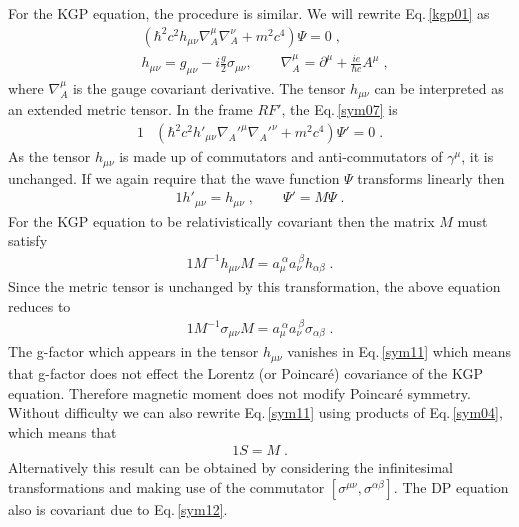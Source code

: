 \documentclass[epj]{svjour}
\begin{document}
For the KGP equation, the procedure is similar. We will rewrite Eq.\,\eqref{kgp01} as
\begin{subequations}
\begin{alignat}{1}
\label{sym07} &\left(\hbar^{2}c^{2}h_{\mu\nu}\nabla_{A}^{\mu}\nabla_{A}^{\nu}+m^{2}c^{4}\right)\Psi=0\;,\\
&h_{\mu\nu}=g_{\mu\nu}-i\frac{g}{2}\sigma_{\mu\nu}, \qquad \nabla_{A}^{\mu}=\partial^{\mu}+\frac{ie}{\hbar c}A^{\mu}\;,
\end{alignat}
\end{subequations}
where $\nabla_{A}^{\mu}$ is the gauge covariant derivative. The tensor $h_{\mu\nu}$ can be interpreted as an extended metric tensor. In the frame $RF'$, the Eq.\,\eqref{sym07} is
\begin{alignat}{1}
\label{sym08} &\left(\hbar^{2}c^{2}h'_{\mu\nu}\nabla_{A}'^{\mu}\nabla_{A}'^{\nu}+m^{2}c^{4}\right)\Psi'=0\;.
\end{alignat}
As the tensor $h_{\mu\nu}$ is made up of commutators and anti-commutators of $\gamma^{\mu}$, it is unchanged. If we again require that the wave function $\Psi$ transforms linearly then
\begin{alignat}{1}
\label{sym09} h'_{\mu\nu}=h_{\mu\nu}\;, \qquad \Psi'=M\Psi\;.
\end{alignat} 
For the KGP equation to be relativistically covariant then the matrix $M$ must satisfy
\begin{alignat}{1}
\label{sym10} M^{-1}h_{\mu\nu}M=a_{\mu}^{\ \alpha}a_{\nu}^{\ \beta}h_{\alpha\beta}\;.
\end{alignat} 
Since the metric tensor is unchanged by this transformation, the above equation reduces to
\begin{alignat}{1}
\label{sym11} M^{-1}\sigma_{\mu\nu}M=a_{\mu}^{\ \alpha}a_{\nu}^{\ \beta}\sigma_{\alpha\beta}\;.
\end{alignat} 
The g-factor which appears in the tensor $h_{\mu\nu}$ vanishes in Eq.\,\eqref{sym11} which means that g-factor does not effect the Lorentz (or Poincar\'{e}) covariance of the KGP equation. Therefore magnetic moment does not modify Poincar\'{e} symmetry. Without difficulty we can also rewrite Eq.\,\eqref{sym11} using products of Eq.\,\eqref{sym04}, which means that
\begin{alignat}{1}
\label{sym12} S=M\;.
\end{alignat} 
Alternatively this result can be obtained by considering the infinitesimal transformations and making use of the commutator $[\sigma^{\mu\nu},\sigma^{\alpha\beta}]$.
The DP equation also is covariant due to Eq.\,\eqref{sym12}.
\end{document}
